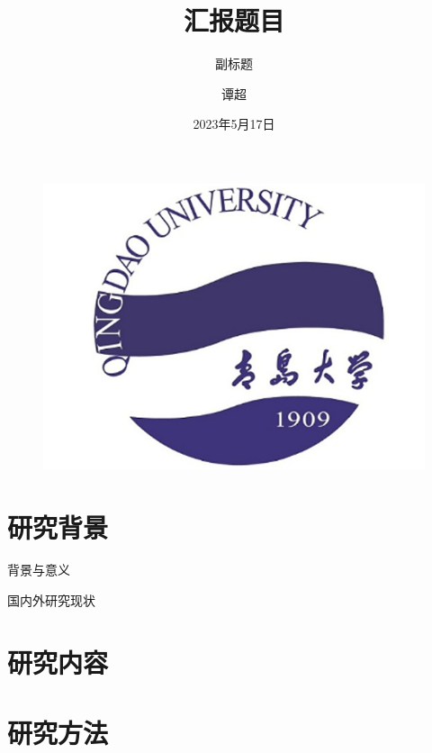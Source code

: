 \documentclass{beamer}
\author{谭超}
\title{汇报题目}
\subtitle{副标题}
\institute{青岛大学商学院}
\date{2023年5月17日}
\begin{document}
\kaishu
\begin{frame}
    \titlepage
    \begin{figure}[htpb]
        \begin{center}
            \includegraphics[width=0.3\linewidth]{logo qd.png}
        \end{center}
    \end{figure}
\end{frame}

\begin{frame}
    \tableofcontents[sectionstyle=show,subsectionstyle=show/shaded/hide,subsubsectionstyle=show/shaded/hide]
\end{frame}





\section{研究背景}

\begin{frame}{背景与意义}
  
        
\end{frame}
\begin{frame}{国内外研究现状}
    
\end{frame}





\section{研究内容}

\begin{frame}{}
    
\end{frame}

\section{研究方法}
\begin{frame}{}
    
\end{frame}
\end{document}
